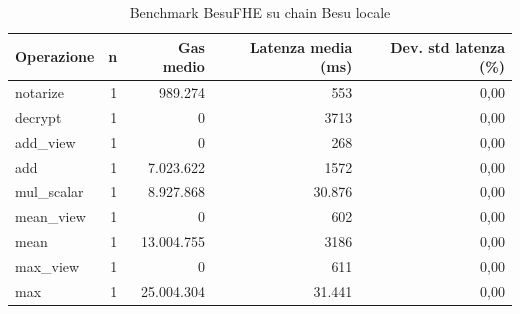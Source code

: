\begin{table}[H]
\centering
\caption{Benchmark BesuFHE su chain Besu locale}
\label{tab:besufhe-local-benchmark}
\begin{tabular}{lrrrr}
\hline
\textbf{Operazione} & \textbf{n} & \textbf{Gas medio} & \textbf{Latenza media (ms)} & \textbf{Dev. std latenza (\%)} \\
\hline
notarize & 1 & 989.274 & 553 & 0,00 \\
decrypt & 1 & 0 & 3713 & 0,00 \\
add\_view & 1 & 0 & 268 & 0,00 \\
add & 1 & 7.023.622 & 1572 & 0,00 \\
mul\_scalar & 1 & 8.927.868 & 30.876 & 0,00 \\
mean\_view & 1 & 0 & 602 & 0,00 \\
mean & 1 & 13.004.755 & 3186 & 0,00 \\
max\_view & 1 & 0 & 611 & 0,00 \\
max & 1 & 25.004.304 & 31.441 & 0,00 \\
\hline
\end{tabular}
\end{table}
\vspace{4pt}

